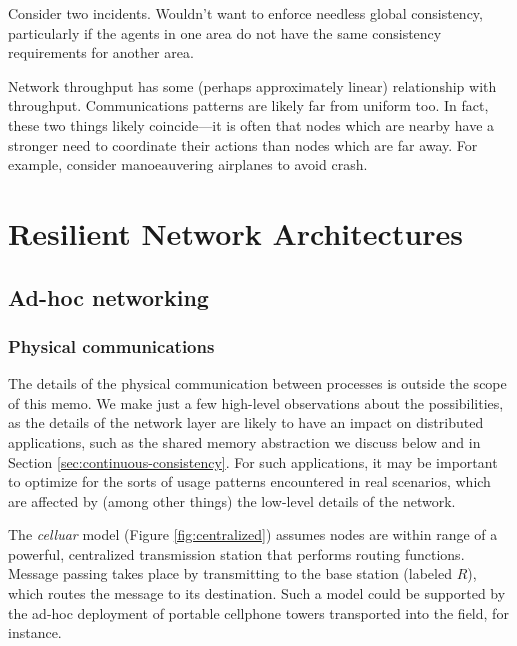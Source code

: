 \documentclass[]             %
{NASA}                       %
\theoremstyle{definition}
\begin{document}
Consider two incidents. Wouldn't want to enforce needless global
consistency, particularly if the agents in one area do not have the same
consistency requirements for another area.

Network throughput has some (perhaps approximately linear) relationship
with throughput. Communications patterns are likely far from uniform
too. In fact, these two things likely coincide---it is often that nodes
which are nearby have a stronger need to coordinate their actions than
nodes which are far away. For example, consider manoeauvering airplanes
to avoid crash.

\newpage

\hypertarget{resilient-network-architectures}{%
\section{Resilient Network
Architectures}\label{resilient-network-architectures}}

\label{sec:networking}

\hypertarget{ad-hoc-networking}{%
\subsection{Ad-hoc networking}\label{ad-hoc-networking}}

\hypertarget{physical-communications}{%
\subsubsection{Physical communications}\label{physical-communications}}

The details of the physical communication between processes is outside
the scope of this memo. We make just a few high-level observations about
the possibilities, as the details of the network layer are likely to
have an impact on distributed applications, such as the shared memory
abstraction we discuss below and in Section
\ref{sec:continuous-consistency}. For such applications, it may be
important to optimize for the sorts of usage patterns encountered in
real scenarios, which are affected by (among other things) the low-level
details of the network.

The \emph{celluar} model (Figure \ref{fig:centralized}) assumes nodes
are within range of a powerful, centralized transmission station that
performs routing functions. Message passing takes place by transmitting
to the base station (labeled \(R\)), which routes the message to its
destination. Such a model could be supported by the ad-hoc deployment of
portable cellphone towers transported into the field, for instance.
\end{document}
